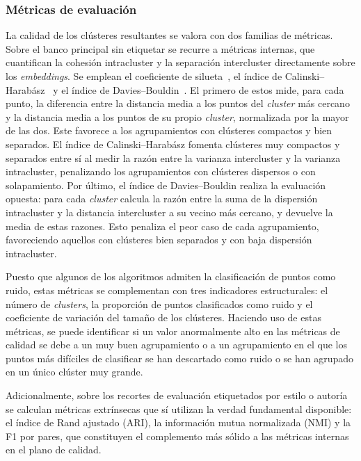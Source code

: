 \subsubsection{Métricas de evaluación}
\label{subsubsec:metricas}
La calidad de los clústeres resultantes se valora con dos familias de métricas.
Sobre el banco principal sin etiquetar se recurre a métricas internas, que
cuantifican la cohesión intracluster y la separación intercluster directamente
sobre los \textit{embeddings}. Se emplean el coeficiente de
silueta~\cite{rousseeuw_silhouettes_1987}, el índice de
Calinski--Harabász~\cite{calinski_dendrite_1974} y el índice de
Davies--Bouldin~\cite{davies_cluster_1979}. El primero de estos mide, para cada
punto, la diferencia entre la distancia media a los puntos del \textit{cluster}
más cercano y la distancia media a los puntos de su propio \textit{cluster},
normalizada por la mayor de las dos. Este favorece a los agrupamientos con
clústeres compactos y bien separados. El índice de Calinski--Harabász fomenta
clústeres muy compactos y separados entre sí al medir la razón entre la
varianza intercluster y la varianza intracluster, penalizando los agrupamientos
con clústeres dispersos o con solapamiento. Por último, el índice de
Davies--Bouldin realiza la evaluación opuesta: para cada \textit{cluster}
calcula la razón entre la suma de la dispersión intracluster y la distancia
intercluster a su vecino más cercano, y devuelve la media de estas razones.
Esto penaliza el peor caso de cada agrupamiento, favoreciendo aquellos con
clústeres bien separados y con baja dispersión intracluster.

Puesto que algunos de los algoritmos admiten la clasificación de puntos como
ruido, estas métricas se complementan con tres indicadores estructurales: el
número de \textit{clusters}, la proporción de puntos clasificados como ruido y
el coeficiente de variación del tamaño de los clústeres. Haciendo uso de estas
métricas, se puede identificar si un valor anormalmente alto en las métricas de
calidad se debe a un muy buen agrupamiento o a un agrupamiento en el que los
puntos más difíciles de clasificar se han descartado como ruido o se han
agrupado en un único clúster muy grande.

Adicionalmente, sobre los recortes de evaluación etiquetados por estilo o
autoría se calculan métricas extrínsecas que sí utilizan la verdad fundamental
disponible: el índice de Rand ajustado (ARI), la información mutua normalizada
(NMI) y la F1 por pares, que constituyen el complemento más sólido a las
métricas internas en el plano de calidad. 

